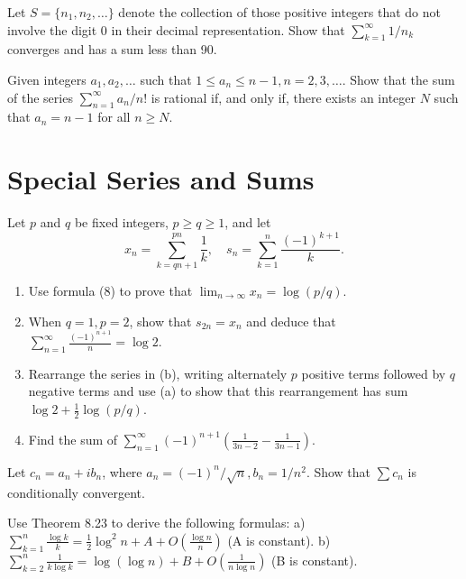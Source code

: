 \begin{problembox}
Let \(S = \{n_1, n_2, \ldots\}\) denote the collection of those positive integers that do not involve the digit 0 in their decimal representation. Show that \(\sum_{k=1}^{\infty} 1/n_k\) converges and has a sum less than 90.
\end{problembox}

\begin{problembox}
Given integers \(a_1, a_2, \ldots\) such that \(1 \leq a_n \leq n - 1, n = 2, 3, \ldots\). Show that the sum of the series \(\sum_{n=1}^{\infty} a_n / n!\) is rational if, and only if, there exists an integer \(N\) such that \(a_n = n - 1\) for all \(n \geq N\).
\end{problembox}

\section{Special Series and Sums}

\begin{problembox}
Let \(p\) and \(q\) be fixed integers, \(p \geq q \geq 1\), and let
\[x_n = \sum_{k=qn+1}^{pn} \frac{1}{k}, \quad s_n = \sum_{k=1}^{n} \frac{(-1)^{k+1}}{k}.\]
\begin{enumerate}[label=\alph*)]
\item Use formula (8) to prove that \(\lim_{n \to \infty} x_n = \log(p/q)\).
\item When \(q = 1, p = 2\), show that \(s_{2n} = x_n\) and deduce that \(\sum_{n=1}^{\infty} \frac{(-1)^{n+1}}{n} = \log 2\).
\item Rearrange the series in (b), writing alternately \(p\) positive terms followed by \(q\) negative terms and use (a) to show that this rearrangement has sum \(\log 2 + \frac{1}{2} \log(p/q)\).
\item Find the sum of \(\sum_{n=1}^{\infty} (-1)^{n+1} \left( \frac{1}{3n - 2} - \frac{1}{3n - 1} \right)\).
\end{enumerate}
\end{problembox}

\begin{problembox}
Let \(c_n = a_n + ib_n\), where \(a_n = (-1)^n/\sqrt{n}, b_n = 1/n^2\). Show that \(\sum c_n\) is conditionally convergent.
\end{problembox}

\begin{problembox}
Use Theorem 8.23 to derive the following formulas:
a) \(\sum_{k=1}^{n} \frac{\log k}{k} = \frac{1}{2} \log^2 n + A + O \left( \frac{\log n}{n} \right)\) (A is constant).
b) \(\sum_{k=2}^{n} \frac{1}{k \log k} = \log (\log n) + B + O \left( \frac{1}{n \log n} \right)\) (B is constant).
\end{problembox}

